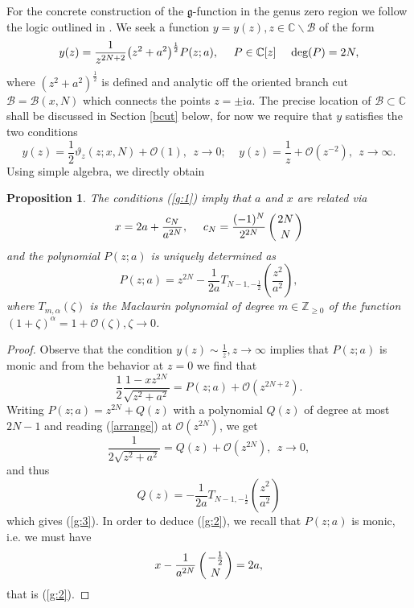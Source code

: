 \documentclass[10pt,reqno,oneside]{amsart}
\def \gg{{\mathfrak g}}
\newcommand{\im}{\mathrm{i}}
\numberwithin{equation}{section}
\newtheorem{proposition}[theo]{Proposition}
\def\le{\left}
\def\ri{\right}
\def\bp{\begin{proposition}}
\def\ep{\end{proposition}}
\def\z{\zeta}
\def\eqref#1{(\ref{#1})}
\def\binom#1#2{\le({#1 \atop #2}\ri)}
\begin{document}
For the concrete construction of the $\gg$-function in the genus zero region we follow the logic outlined in \cite{BB}. We seek a function $y=y(z),z\in\mathbb{C}\backslash\mathcal{B}$  of the form 
\begin{equation}
	y(z)=\frac{1}{z^{2N+2}}\big(z^2+a^2\big)^{\frac{1}{2}}P(z;a),\ \ \ \ P\in\mathbb{C}[z]\ \ \ \ \textnormal{deg}(P)=2N,
	\label{y1}
\end{equation}
where $(z^2+a^2)^{\frac{1}{2}}$ is defined and analytic off the oriented branch cut $\mathcal{B}=\mathcal{B}(x,N)$ which connects the points $z=\pm \im a$. The precise location of $\mathcal{B}\subset\mathbb{C}$ shall be discussed in Section \ref{bcut} below, for now we require that $y$ satisfies the two conditions
\begin{equation}\label{g:1}
	y(z)=\frac{1}{2}\vartheta_z(z;x,N)+\mathcal{O}(1),\ \ z\rightarrow 0;\ \ \ \ \ y(z)=\frac{1}{z}+\mathcal{O}\left(z^{-2}\right),\ \ z\rightarrow\infty.
\end{equation}
Using simple algebra, we directly obtain
\bp The conditions \eqref{g:1} imply that $a$ and $x$ are related via
\begin{equation}\label{g:2}
	x=2a+\frac{c_N}{a^{2N}},\ \ \ \ c_N=\frac{(-1)^N}{2^{2N}}\binom{2N}{N}
\end{equation}
and the polynomial $P(z;a)$ is uniquely determined as
\begin{equation}\label{g:3}
	P(z;a)=z^{2N}-\frac{1}{2a}T_{N-1,-\frac{1}{2}}\left(\frac{z^2}{a^2}\right),
\end{equation}
where $T_{m,\alpha}(\z)$ is the Maclaurin polynomial of degree $m\in\mathbb{Z}_{\geq 0}$ of the function $(1+\z)^{\alpha} = 1+\mathcal{O}(\z),\z\rightarrow 0$.
\ep
\begin{proof} Observe that the condition $y(z)\sim\frac{1}{z},z\rightarrow\infty$ implies that $P(z;a)$ is monic and from the behavior at $z=0$ we find that
\begin{equation}\label{arrange}
	\frac{1}{2}\frac{1-xz^{2N}}{\sqrt{z^2+a^2}}=P(z;a)+\mathcal{O}\left(z^{2N+2}\right).
\end{equation}
Writing $P(z;a)=z^{2N}+Q(z)$ with a polynomial $Q(z)$ of degree at most $2N-1$ and reading \eqref{arrange} at $\mathcal{O}\left(z^{2N}\right)$, we get
\begin{equation*}
	\frac{1}{2\sqrt{z^2+a^2}}=Q(z)+\mathcal{O}\left(z^{2N}\right),\ \ z\rightarrow 0,
\end{equation*}
and thus
\begin{equation*}
	Q(z)=-\frac{1}{2a}T_{N-1,-\frac{1}{2}}\left(\frac{z^2}{a^2}\right)
\end{equation*}
which gives \eqref{g:3}. In order to deduce \eqref{g:2}, we recall that $P(z;a)$ is monic, i.e. we must have
\begin{equation*}
	x-\frac{1}{a^{2N}}\binom{-\frac{1}{2}}{N}=2a,
\end{equation*}
that is \eqref{g:2}.
\end{proof}
\end{document}

